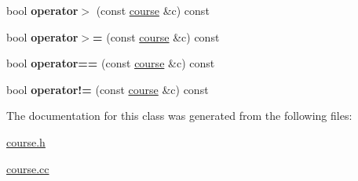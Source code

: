 \begin{DoxyCompactItemize}
bool {\bfseries operator$>$} (const \hyperlink{classcourse}{course} \&c) const
\item 
\hypertarget{classcourse_ad15d2508cfb6d22103aaec608bcfdc74}{}\label{classcourse_ad15d2508cfb6d22103aaec608bcfdc74} 
bool {\bfseries operator$>$=} (const \hyperlink{classcourse}{course} \&c) const
\item 
\hypertarget{classcourse_aafce75fc85cdb94a5a08eaaba359da16}{}\label{classcourse_aafce75fc85cdb94a5a08eaaba359da16} 
bool {\bfseries operator==} (const \hyperlink{classcourse}{course} \&c) const
\item 
\hypertarget{classcourse_ae01c5e2445600d485da28e0ba7c48b3a}{}\label{classcourse_ae01c5e2445600d485da28e0ba7c48b3a} 
bool {\bfseries operator!=} (const \hyperlink{classcourse}{course} \&c) const
\end{DoxyCompactItemize}


The documentation for this class was generated from the following files\+:\begin{DoxyCompactItemize}
\item 
\hyperlink{course_8h}{course.\+h}\item 
\hyperlink{course_8cc}{course.\+cc}\end{DoxyCompactItemize}
